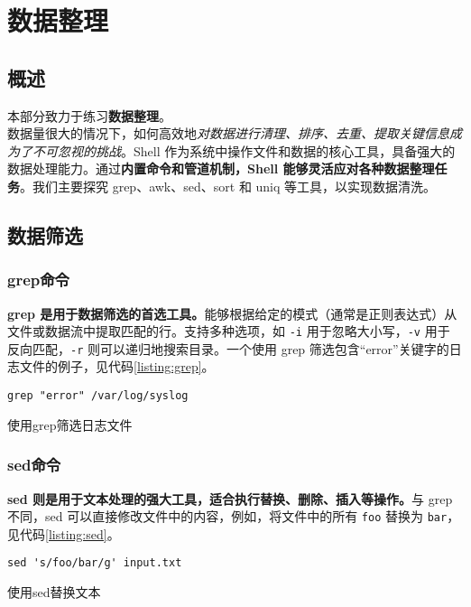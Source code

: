 \chapter{数据整理}
\label{cp:dataclean}

\section{概述}

本部分致力于练习\textbf{数据整理}。\\

数据量很大的情况下，如何高效地\textit{对数据进行清理、排序、去重、提取关键信息成为了不可忽视的挑战}。Shell 作为系统中操作文件和数据的核心工具，具备强大的数据处理能力。通过\textbf{内置命令和管道机制，Shell 能够灵活应对各种数据整理任务}。我们主要探究 grep、awk、sed、sort 和 uniq 等工具，以实现数据清洗。

\section{数据筛选}

\subsection{grep命令}

\textbf{grep 是用于数据筛选的首选工具。}能够根据给定的模式（通常是正则表达式）从文件或数据流中提取匹配的行。支持多种选项，如 \texttt{-i} 用于忽略大小写，\texttt{-v} 用于反向匹配，\texttt{-r} 则可以递归地搜索目录。一个使用 grep 筛选包含“error”关键字的日志文件的例子，见代码\ref{listing:grep}。

\begin{longlisting}
    \begin{verbatim}
grep "error" /var/log/syslog
    \end{verbatim}
    \caption{使用grep筛选日志文件}
    \label{listing:grep}
\end{longlisting}

\subsection{sed命令}

\textbf{sed 则是用于文本处理的强大工具，适合执行替换、删除、插入等操作。}与 grep 不同，sed 可以直接修改文件中的内容，例如，将文件中的所有 \texttt{foo} 替换为 \texttt{bar}，见代码\ref{listing:sed}。

\begin{longlisting}
    \begin{verbatim}
sed 's/foo/bar/g' input.txt
    \end{verbatim}
    \caption{使用sed替换文本}
    \label{listing:sed}
\end{longlisting}

